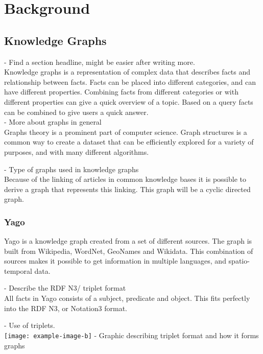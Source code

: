 
\chapter{Background}

\section{Knowledge Graphs}
- Find a section headline, might be easier after writing more.\\
Knowledge graphs is a representation of complex data that describes facts and relationship between facts. Facts can be placed into different categories, and can have different properties. Combining facts from different categories or with different properties can give a quick overview of a topic. Based on a query facts can be combined to give users a quick answer.\\

- More about graphs in general\\
Graphs theory is a prominent part of computer science. Graph structures is a common way to create a dataset that can be efficiently explored for a variety of purposes, and with many different algorithms. 

- Type of graphs used in knowledge graphs\\
Because of the linking of articles in common knowledge bases it is possible to derive a graph that represents this linking. This graph will be a cyclic directed graph.


\subsection{Yago}
Yago\cite{yago} is a knowledge graph created from a set of different sources. The graph is built from Wikipedia, WordNet, GeoNames and Wikidata. This combination of sources makes it possible to get information in multiple languages, and spatio-temporal data.

- Describe the RDF N3/ triplet format\\
All facts in Yago consists of a subject, predicate and object. This fits perfectly into the RDF N3, or Notation3 format.

- Use of triplets.\\

\texttt{[image: example-image-b]}
- Graphic describing triplet format and how it forms graphs


